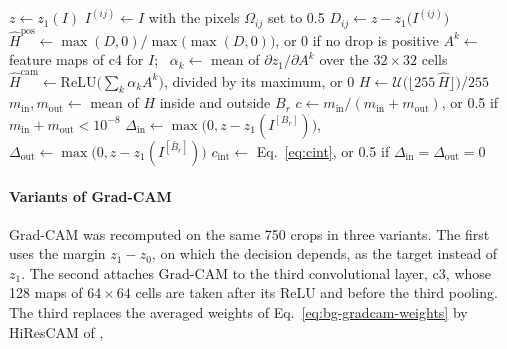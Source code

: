 \begin{algorithm}[tbp]
\caption[Centre measures of one crop]{Centre measures of one analysed crop $I$ at ratio
$r$ for positive-drops occlusion, Grad-CAM and the intervention centre measure.
$z_1(\cdot)$ is the positive-class logit of the trained model in evaluation mode.}
\label{alg:centre-measures}
\begin{algorithmic}[1]
\State $z \gets z_1(I)$ 
 
  \State $I^{(ij)} \gets I$ with the pixels $\Omega_{ij}$ set to 0.5
  \State $D_{ij} \gets z - z_1\big(I^{(ij)}\big)$ 
\EndFor
\State $\hat{H}^{\mathrm{pos}} \gets \max(D, 0) / \max\big(\max(D, 0)\big)$, or 0 if no drop is positive 
\State $A^k \gets$ feature maps of c4 for $I$; \ $\alpha_k \gets$ mean of $\partial z_1 / \partial A^k$ over the $32 \times 32$ cells
\State $\hat{H}^{\mathrm{cam}} \gets \mathrm{ReLU}\big(\sum_k \alpha_k A^k\big)$, divided by its maximum, or 0 
  \State $H \gets \mathcal{U}\big(\lfloor 255\,\hat{H} \rfloor\big) / 255$ 
  \State $m_{\mathrm{in}}, m_{\mathrm{out}} \gets$ mean of $H$ inside and outside $B_r$ 
  \State $c \gets m_{\mathrm{in}} / (m_{\mathrm{in}} + m_{\mathrm{out}})$, or 0.5 if $m_{\mathrm{in}} + m_{\mathrm{out}} < 10^{-8}$ 
\EndFor
\State $\Delta_{\mathrm{in}} \gets \max\big(0, z - z_1(I^{[B_r]})\big)$, \ $\Delta_{\mathrm{out}} \gets \max\big(0, z - z_1(I^{[\bar{B}_r]})\big)$ 
\State $c_{\mathrm{int}} \gets$ Eq.~\eqref{eq:cint}, or 0.5 if $\Delta_{\mathrm{in}} = \Delta_{\mathrm{out}} = 0$
\end{algorithmic}
\end{algorithm}

\paragraph{Variants of Grad-CAM}
\label{sec:methodology-camvariants}
Grad-CAM was recomputed on the same 750 crops in three variants. The first uses the
margin $z_1 - z_0$, on which the decision depends, as the target instead of $z_1$. The
second attaches Grad-CAM to the third convolutional layer, c3, whose 128 maps of
$64 \times 64$ cells are taken after its ReLU and before the third pooling. The third
replaces the averaged weights of Eq.~\eqref{eq:bg-gradcam-weights} by HiResCAM of
\citet{draelos2021hirescam},

